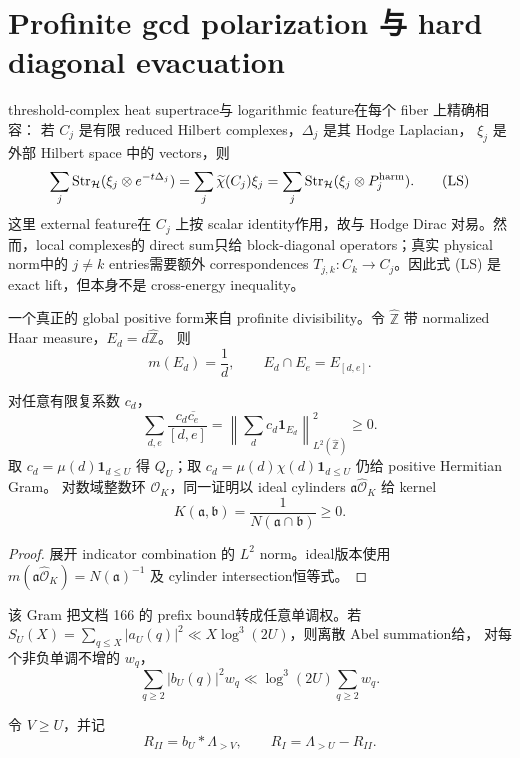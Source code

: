 \section{Profinite gcd polarization 与 hard diagonal evacuation}

threshold-complex heat supertrace与 logarithmic feature在每个 fiber 上精确相容：
若 $C_j$ 是有限 reduced Hilbert complexes，$\Delta_j$ 是其 Hodge Laplacian，
$\xi_j$ 是外部 Hilbert space 中的 vectors，则
\[
 \sum_j\operatorname{Str}_{\mathcal H}
   (\xi_j\otimes e^{-t\Delta_j})
 =\sum_j\widetilde\chi(C_j)\xi_j
 =\sum_j\operatorname{Str}_{\mathcal H}
   (\xi_j\otimes P_j^{\rm harm}).                \tag{LS}
\]
这里 external feature在 $C_j$ 上按 scalar identity作用，故与 Hodge Dirac
对易。然而，local complexes的 direct sum只给 block-diagonal operators；真实
physical norm中的 $j\neq k$ entries需要额外 correspondences
$T_{j,k}:C_k\to C_j$。因此式 (LS) 是 exact lift，但本身不是 cross-energy
inequality。

一个真正的 global positive form来自 profinite divisibility。令
$\widehat{\mathbb Z}$ 带 normalized Haar measure，$E_d=d\widehat{\mathbb Z}$。
则
\[
 m(E_d)=\frac1d,\qquad E_d\cap E_e=E_{[d,e]}.
\]

\begin{theorem}
对任意有限复系数 $c_d$，
\[
 \sum_{d,e}\frac{c_d\overline{c_e}}{[d,e]}
 =\left\|\sum_dc_d\mathbf1_{E_d}\right\|_{L^2(\widehat{\mathbb Z})}^2
 \geq0.                                           \tag{PG}
\]
取 $c_d=\mu(d)\mathbf1_{d\leq U}$ 得 $Q_U$；取
$c_d=\mu(d)\chi(d)\mathbf1_{d\leq U}$ 仍给 positive Hermitian Gram。
对数域整数环 $\mathcal O_K$，同一证明以 ideal cylinders
$\mathfrak a\widehat{\mathcal O}_K$ 给 kernel
\[
 K(\mathfrak a,\mathfrak b)
 =\frac1{N(\mathfrak a\cap\mathfrak b)}\geq0.
\]
\end{theorem}

\begin{proof}
展开 indicator combination 的 $L^2$ norm。ideal版本使用
$m(\mathfrak a\widehat{\mathcal O}_K)=N(\mathfrak a)^{-1}$ 及 cylinder
intersection恒等式。
\end{proof}

该 Gram 把文档 166 的 prefix bound转成任意单调权。若
$S_U(X)=\sum_{q\leq X}|a_U(q)|^2\ll X\log^3(2U)$，则离散 Abel summation给，
对每个非负单调不增的 $w_q$，
\[
 \sum_{q\geq2}|b_U(q)|^2w_q
 \ll\log^3(2U)\sum_{q\geq2}w_q.                 \tag{MW}
\]

令 $V\geq U$，并记
\[
 R_{II}=b_U*\Lambda_{>V},\qquad
 R_I=\Lambda_{>U}-R_{II}.
\]

